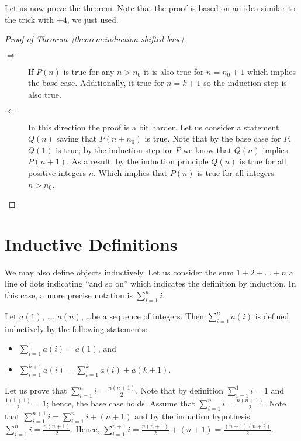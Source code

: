 Let us now prove the theorem. Note that the proof is based on an idea similar
to the trick with $+4$, we just used.
\begin{proof}[Proof of Theorem~\ref{theorem:induction-shifted-base}]
  \begin{description}
    \item[$\Rightarrow$] If $P(n)$ is true for any $n > n_0$ it is also true
      for $n = n_0 + 1$ which implies the base case. Additionally, it true for
      $n = k + 1$ so the induction step is also true.
    \item[$\Leftarrow$] In this direction the proof is a bit harder. Let us
      consider a statement $Q(n)$ saying that $P(n + n_0)$ is true. Note that
      by the base case for $P$, $Q(1)$ is true; by the induction step for $P$
      we know that $Q(n)$ implies $P(n + 1)$. As a result, by the induction
      principle $Q(n)$ is true for all positive integers $n$. Which implies
      that $P(n)$ is true for all integers $n > n_0$.
  \end{description}
\end{proof}

\section{Inductive Definitions}

We may also define objects inductively. Let us consider the sum
$1 + 2 + \dots + n$ a line of dots indicating ``and so on'' which indicates the
definition by induction. In this case, a more precise notation is
$\sum_{i = 1}^n i$.

\begin{definition}
  Let $a(1)$, \dots, $a(n)$, \dots be a sequence of integers. Then
  $\sum_{i = 1}^n a(i)$ is defined inductively by the following
  statements:
  \begin{itemize}
    \item $\sum_{i = 1}^1 a(i) = a(1)$, and
    \item $\sum_{i = 1}^{k + 1} a(i) =
        \sum_{i = 1}^k a(i) + a(k + 1)$.
  \end{itemize}
\end{definition}

Let us prove that $\sum_{i = 1}^n i = \frac{n (n + 1)}{2}$.
Note that by definition $\sum_{i = 1}^1 i = 1$ and
$\frac{1 (1 + 1)}{2} = 1$; hence, the base case holds. Assume that
$\sum_{i = 1}^n i = \frac{n (n + 1)}{2}$. Note that
$\sum_{i = 1}^{n + 1} i = \sum_{i = 1}^n i + (n + 1)$ and by the
induction hypothesis $\sum_{i = 1}^n i = \frac{n (n + 1)}{2}$.
Hence, $\sum_{i = 1}^{n + 1} i = \frac{n (n + 1)}{2} + (n + 1) =
\frac{(n + 1)(n + 2)}{2}$.


